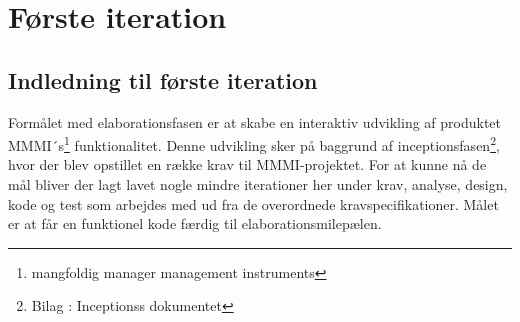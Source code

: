 \section{Første iteration}

\subsection{Indledning til første iteration}
Formålet med elaborationsfasen er at skabe en interaktiv udvikling af produktet MMMI´s\footnote{{mangfoldig manager management instruments}} funktionalitet. Denne udvikling sker på baggrund af inceptionsfasen\footnote{{Bilag : Inceptionss dokumentet}}, hvor der blev opstillet en række krav til MMMI-projektet.  For at kunne nå de mål bliver der lagt lavet nogle mindre iterationer her under krav, analyse, design, kode og test som arbejdes med ud fra de overordnede kravspecifikationer. Målet er at får en funktionel kode færdig til elaborationsmilepælen. 









